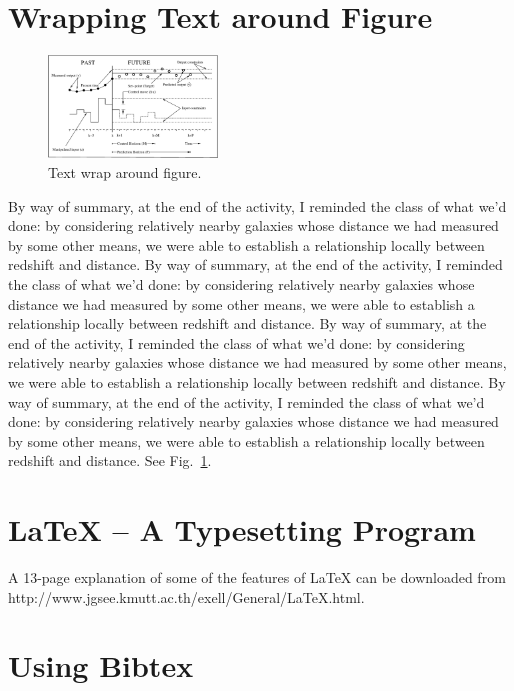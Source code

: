 \section{Wrapping Text around Figure}


\renewcommand{\baselinestretch}{1}
\begin{figure}
\includegraphics[width=0.4\textwidth]{mpc.eps}
\caption{ Text wrap around figure. \label{fig:test}}
\end{figure}

\renewcommand{\baselinestretch}{2}
\large\normalsize

By way of summary, at the end of the activity, I reminded the class of what we'd done:  by considering relatively nearby galaxies whose distance we had measured by some other means, we were able to establish a relationship locally between redshift and distance.
By way of summary, at the end of the activity, I reminded the class of what we'd done:  by considering relatively nearby galaxies whose distance we had measured by some other means, we were able to establish a relationship locally between redshift and distance.
By way of summary, at the end of the activity, I reminded the class of what we'd done:  by considering relatively nearby galaxies whose distance we had measured by some other means, we were able to establish a relationship locally between redshift and distance.
By way of summary, at the end of the activity, I reminded the class of what we'd done:  by considering relatively nearby galaxies whose distance we had measured by some other means, we were able to establish a relationship locally between redshift and distance.  See Fig.~\ref{fig:test}.


\section{LaTeX -- A Typesetting Program}

A 13-page explanation of some of the features of LaTeX can be downloaded from http://www.jgsee.kmutt.ac.th/exell/General/LaTeX.html.


\section{Using Bibtex}

